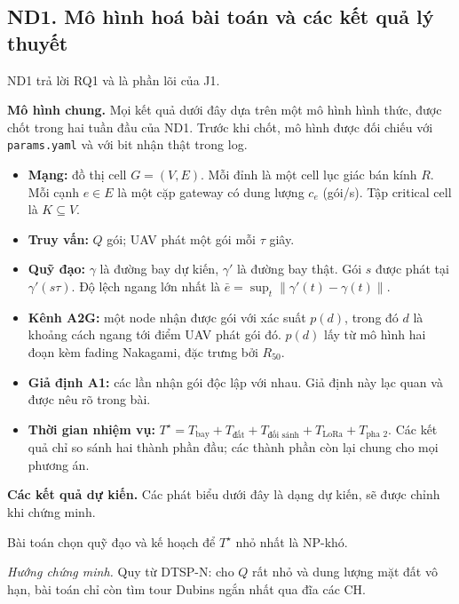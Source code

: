 \subsection{ND1. Mô hình hoá bài toán và các kết quả lý thuyết}

ND1 trả lời RQ1 và là phần lõi của J1.

\textbf{Mô hình chung.} Mọi kết quả dưới đây dựa trên một mô hình hình thức, được chốt trong hai tuần đầu của ND1. Trước khi chốt, mô hình được đối chiếu với \texttt{params.yaml} và với bit nhận thật trong log.

\begin{itemize}\tightlist
\item \textbf{Mạng:} đồ thị cell $G=(V,E)$. Mỗi đỉnh là một cell lục giác bán kính $R$. Mỗi cạnh $e\in E$ là một cặp gateway có dung lượng $c_e$ (gói/s). Tập critical cell là $K\subseteq V$.
\item \textbf{Truy vấn:} $Q$ gói; UAV phát một gói mỗi $\tau$ giây.
\item \textbf{Quỹ đạo:} $\gamma$ là đường bay dự kiến, $\gamma'$ là đường bay thật. Gói $s$ được phát tại $\gamma'(s\tau)$. Độ lệch ngang lớn nhất là $\bar e=\sup_t\lVert\gamma'(t)-\gamma(t)\rVert$.
\item \textbf{Kênh A2G:} một node nhận được gói với xác suất $p(d)$, trong đó $d$ là khoảng cách ngang tới điểm UAV phát gói đó. $p(d)$ lấy từ mô hình hai đoạn kèm fading Nakagami, đặc trưng bởi $R_{50}$.
\item \textbf{Giả định A1:} các lần nhận gói độc lập với nhau. Giả định này lạc quan và được nêu rõ trong bài.
\item \textbf{Thời gian nhiệm vụ:} $T^\star=T_{\text{bay}}+T_{\text{đất}}+T_{\text{đối sánh}}+T_{\text{LoRa}}+T_{\text{pha 2}}$. Các kết quả chỉ so sánh hai thành phần đầu; các thành phần còn lại chung cho mọi phương án.
\end{itemize}

\textbf{Các kết quả dự kiến.} Các phát biểu dưới đây là dạng dự kiến, sẽ được chỉnh khi chứng minh.

\begin{lemma}[Độ khó]\label{lem:np}
Bài toán chọn quỹ đạo và kế hoạch để $T^\star$ nhỏ nhất là NP-khó.
\end{lemma}
\noindent\emph{Hướng chứng minh.} Quy từ DTSP-N: cho $Q$ rất nhỏ và dung lượng mặt đất vô hạn, bài toán chỉ còn tìm tour Dubins ngắn nhất qua đĩa các CH.

